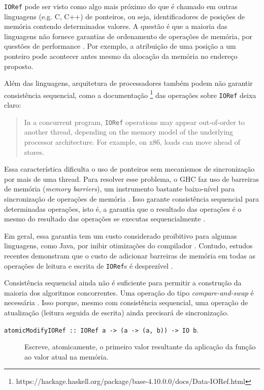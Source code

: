\documentclass[a4paper,12pt,oldfontcommands]{abntex2}
\begin{document}
\texttt{IORef} pode ser visto como algo mais próximo do que é chamado em outras linguagens (e.g. C, C++) de ponteiros, ou seja, identificadores de posições de memória contendo determinados valores. A questão é que a maioria das linguagens não fornece garantias de ordenamento de operações de memória, por questões de performance \cite{herlihy2011art}. Por exemplo, a atribuição de uma posição a um ponteiro pode acontecer antes mesmo da alocação da memória no endereço proposto.

Além das linguagens, arquitetura de processadores também podem não garantir consistência sequencial, como a documentação \footnote{https://hackage.haskell.org/package/base-4.10.0.0/docs/Data-IORef.html} das operações sobre \texttt{IORef} deixa claro:

\begin{quote}
In a concurrent program, \texttt{IORef} operations may appear out-of-order to another thread, depending on the memory model of the underlying processor architecture. For example, on x86, loads can move ahead of stores.
\end{quote}

Essa característica dificulta o uso de ponteiros sem mecanismos de sincronização por mais de uma thread. Para resolver esse problema, o GHC faz uso de barreiras de memória (\textit{memory barriers}), um instrumento bastante baixo-nível para sincronização de operações de memória \cite{sulzmann2009comparing}. Isso garante consistência sequencial para determinadas operações, isto é, a garantia que o resultado das operações é o mesmo do resultado das operações se executas sequencialmente \cite{herlihy2011art}.

Em geral, essa garantia tem um custo considerado proibitivo para algumas linguagens, como Java, por inibir otimizações do compilador \cite{herlihy2011art}. Contudo, estudos recentes demonstram que o custo de adicionar barreiras de memória em todas as operações de leitura e escrita de \texttt{IORef}s é desprezível \cite{vollmer2017sc}.

Consistência sequencial ainda não é suficiente para permitir a construção da maioria dos algoritmos concorrentes. Uma operação do tipo \textit{compare-and-swap} é necessária \cite{sulzmann2009comparing}. Isso porque, mesmo com consistência sequencial, uma operação de atualização (leitura seguida de escrita) ainda precisará de sincronização.

\begin{description}
\item [\texttt{atomicModifyIORef :: IORef a -> (a -> (a, b)) -> IO b}.] Escreve, atomicamente, o primeiro valor resultante da aplicação da função ao valor atual na memória.
\end{description}
\end{document}
